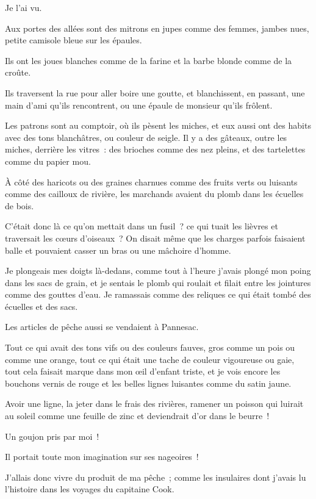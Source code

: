\documentclass[french,twoside]{book} %
\begin{document}
Je l’ai vu.\par
\bigbreak
\noindent Aux portes des allées sont des mitrons en jupes comme des femmes, jambes nues, petite camisole bleue sur les épaules.\par
Ils ont les joues blanches comme de la farine et la barbe blonde comme de la croûte.\par
Ils traversent la rue pour aller boire une goutte, et blanchissent, en passant, une main d’ami qu’ils rencontrent, ou une épaule de monsieur qu’ils frôlent.\par
Les patrons sont au comptoir, où ils pèsent les miches, et eux aussi ont des habits avec des tons blanchâtres, ou couleur de seigle. Il y a des gâteaux, outre les miches, derrière les vitres : des brioches comme des nez pleins, et des tartelettes comme du papier mou.\par
À côté des haricots ou des graines charnues comme des fruits verts ou luisants comme des cailloux de rivière, les marchands avaient du plomb dans les écuelles de bois.\par
C’était donc là ce qu’on mettait dans un fusil ? ce qui tuait les lièvres et traversait les cœurs d’oiseaux ? On disait même que les charges parfois faisaient balle et pouvaient casser un bras ou une mâchoire d’homme.\par
Je plongeais mes doigts là-dedans, comme tout à l’heure j’avais plongé mon poing dans les sacs de grain, et je sentais le plomb qui roulait et filait entre les jointures comme des gouttes d’eau. Je ramassais comme des reliques ce qui était tombé des écuelles et des sacs.\par
\bigbreak
\noindent Les articles de pêche aussi se vendaient à Pannesac.\par
Tout ce qui avait des tons vifs ou des couleurs fauves, gros comme un pois ou comme une orange, tout ce qui était une tache de couleur vigoureuse ou gaie, tout cela faisait marque dans mon œil d’enfant triste, et je vois encore les bouchons vernis de rouge et les belles lignes luisantes comme du satin jaune.\par
Avoir une ligne, la jeter dans le frais des rivières, ramener un poisson qui luirait au soleil comme une feuille de zinc et deviendrait d’or dans le beurre !\par
Un goujon pris par moi !\par
Il portait toute mon imagination sur ses nageoires !\par
J’allais donc vivre du produit de ma pêche ; comme les insulaires dont j’avais lu l’histoire dans les voyages du capitaine Cook.\par
\end{document}
